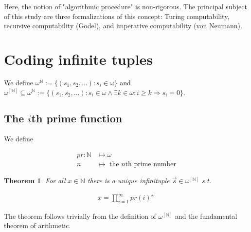 \documentclass[a4paper, 12pt]{article}
\newtheorem{theorem}{Theorem}
\newtheorem{theorem}{Theorem}
\begin{document}
Here, the notion of "algorithmic procedure" is non-rigorous. The principal
subject of this study are three formalizations of this concept: Turing
computability, recursive computability (Godel), and imperative
computability (von Neumann).

\pagebreak

\section{Coding infinite tuples}

We define $\omega^{\mathbb{N}} := \{ (s_1, s_2, \ldots) : s_i \in \omega \}$ and
$\omega^{\left[ \mathbb{N} \right] } \subseteq \omega^{\mathbb{N}} := \{(s_1,
s_2, \ldots) : s_i \in \omega \land \exists k \in \omega : i \geq k
\Rightarrow s_i = 0\}$. 

\subsection{The $i$th prime function}

We define 

\begin{align*}
    pr : \mathbb{N} &\mapsto \omega  \\ 
    n &\mapsto \text{ the $n$th prime number}
\end{align*}

\begin{theorem}
    For all $x \in \mathbb{N}$ there is a unique infinituple $\overrightarrow{s}
    \in \omega^{[\mathbb{N}]}$ s.t. 

    \begin{align*}
        x = \prod_{i=1}^{\infty} pr(i)^{s_i}
    \end{align*}
\end{theorem}

The theorem follows trivially from the definition of $\omega^{[\mathbb{N}]}$ and
the fundamental theorem of arithmetic. 
\end{document}

